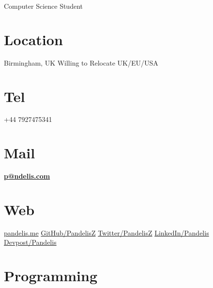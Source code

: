 \documentclass[]{friggeri-cv}
\begin{document}
      {Computer Science Student}


\begin{aside}
  \section{Location}
    Birmingham, UK
    Willing to Relocate
    UK/EU/USA
    ~
  \section{Tel}
    +44 7927475341
    ~
  \section{Mail}
    \href{mailto:p@ndelis.com}{\textbf{p@ndelis.com}}
    ~
  \section{Web}
    \href{http://pandelis.me}{pandelis.me}
    \href{https://github.com/pandelisz}{GitHub/PandelisZ}
    \href{https://twitter.com/pandelisz}{Twitter/PandelisZ}
    \href{https://linkedin.com/in/pandelis}{LinkedIn/Pandelis}
    \href{https://devpost.com/pandelis}{Devpost/Pandelis}
    ~
  \section{Programming}


\end{aside}
\end{document}
